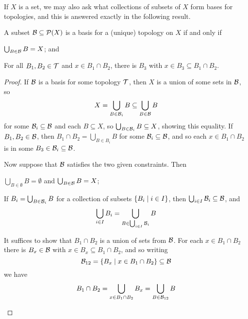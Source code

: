 \documentclass[11pt]{article}
\begin{document}
If $X$ is a set, we may also ask what collections of subsets of $X$ form bases for topologies, and this is answered exactly in the following result.
\begin{proposition}
    A subset $\mathcal{B} \subseteq \mathcal{P}(X)$ is a basis for a (unique) topology on $X$ if and only if
    \begin{enum}
        \item $\bigcup_{B \in \mathcal{B}}B = X$; and
        \item For all $B_1, B_2 \in \mathcal{T}$ and $x \in B_1 \cap B_2$, there is $B_3$ with $x \in B_3 \subseteq B_1 \cap B_2$.
    \end{enum}
\end{proposition}
\begin{proof}
    If $\mathcal{B}$ is a basis for some topology $\mathcal{T}$, then $X$ is a union of some sets in $\mathcal{B}$, so 
    $$
        X = \bigcup_{B \in \mathcal{B}_i}B \subseteq \bigcup_{B \in \mathcal{B}}B
    $$
    for some $\mathcal{B}_i \subseteq \mathcal{B}$ and each $B \subseteq X$, so $\bigcup_{B \in \mathcal{B}_i}B \subseteq X$, showing this equality. If $B_1, B_2 \in \mathcal{B}$, then $B_1 \cap B_2 = \bigcup_{B \in B_i}B$ for some $\mathcal{B}_i \subseteq \mathcal{B}$, and so each $x \in B_1 \cap B_2$ is in some $B_3 \in \mathcal{B}_i \subseteq \mathcal{B}$.

    Now suppose that $\mathcal{B}$ satisfies the two given constraints. Then
    \begin{enum}
        \item $\bigcup_{B \in \emptyset} B = \emptyset$ and $\bigcup_{B \in \mathcal{B}} B = X$;
        \item If $B_i = \bigcup_{B \in \mathcal{B}_i} B$ for a collection of subsets $\left\{  B_i \mid i \in I  \right\}$, then $\bigcup_{i \in I} \mathcal{B}_i \subseteq \mathcal{B}$, and
        $$
            \bigcup_{i \in I} B_i = \bigcup_{B \in \bigcup_{i \in I} \mathcal{B}_i} B
        $$
        \item It suffices to show that $B_1 \cap B_2$ is a union of sets from $\mathcal{B}$. For each $x \in B_1 \cap B_2$ there is $B_x \in \mathcal{B}$ with $x \in B_x \subseteq B_1 \cap B_2$, and so writing
        $$
            \mathcal{B}_{12} = \left\{  B_x \mid x \in B_1 \cap B_2  \right\} \subseteq \mathcal{B}
        $$
        we have
        $$
            B_1 \cap B_2 = \bigcup_{x \in B_1 \cap B_2} B_x = \bigcup_{B \in \mathcal{B}_{12}} B
        $$
    \end{enum}
\end{proof}




\end{document}
